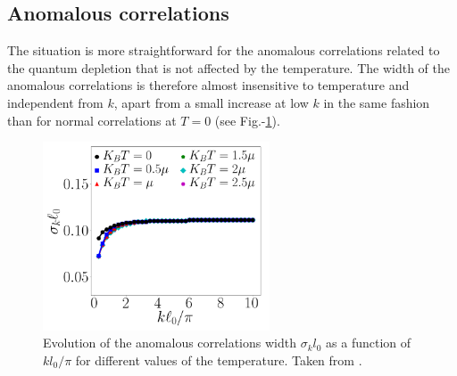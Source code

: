 
\subsection{Anomalous correlations}

The situation is more straightforward for the anomalous correlations related to the quantum depletion that is not affected by the temperature. The width of the anomalous correlations is therefore almost insensitive to temperature and independent from $k$, apart from a small increase at low $k$ in the same fashion than for normal correlations at $T=0$ (see Fig.-\ref{fig:butera_kmk}). 

\begin{figure}
    \centering
    \includegraphics[width=0.6\textwidth]{Fig/Chapter1/butera_kmk.png}
    \caption[Evolution of the anomalous correlations width with $k$ for different values of the temperature]{Evolution of the anomalous correlations width $\sigma_k l_0$ as a function of $k l_0/\pi$ for different values of the temperature. Taken from \cite{butera2020}.}
    \label{fig:butera_kmk}
\end{figure}

